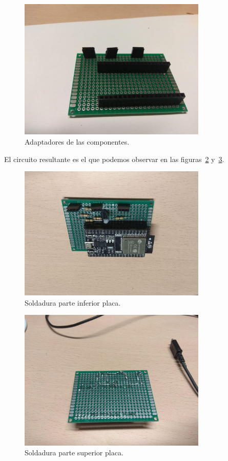 \documentclass[a4paper,10pt]{article}
\begin{document}
\begin{figure}
  \centering
  \includegraphics[width=0.8\textwidth]{img/placa_con_adaptadores_pines.jpg}
  \caption{Adaptadores de las componentes.}\label{fig:visual-adaptadores}
\end{figure}

El circuito resultante es el que podemos observar en las
figuras~\ref{fig:soldado_superior} y~\ref{fig:soldado_inferior}.

\begin{figure}
  \centering
  \includegraphics[width=0.8\textwidth]{img/soldadura_superior.jpg}
  \caption{Soldadura parte inferior placa.}\label{fig:soldado_superior}
\end{figure}

\begin{figure}
  \centering
  \includegraphics[width=0.8\textwidth]{img/soldadura_inferior.jpg}
  \caption{Soldadura parte superior placa.}\label{fig:soldado_inferior}
\end{figure}
\end{document}
